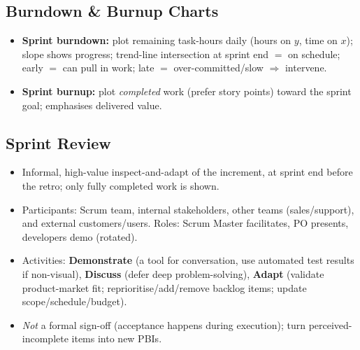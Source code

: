 \documentclass[hidelinks]{article}
\begin{document}
\subsection{Burndown \& Burnup Charts}
\begin{itemize}
  \item \textbf{Sprint burndown:} plot remaining task-hours daily (hours on $y$, time on $x$);
        slope shows progress; trend-line intersection at sprint end $=$ on schedule; early $=$ can
        pull in work; late $=$ over-committed/slow $\Rightarrow$ intervene.
  \item \textbf{Sprint burnup:} plot \emph{completed} work (prefer story points) toward the sprint
        goal; emphasises delivered value.
\end{itemize}

\subsection{Sprint Review}
\begin{itemize}
  \item Informal, high-value inspect-and-adapt of the increment, at sprint end before the retro;
        only fully completed work is shown.
  \item Participants: Scrum team, internal stakeholders, other teams (sales/support), and external
        customers/users. Roles: Scrum Master facilitates, PO presents, developers demo (rotated).
  \item Activities: \textbf{Demonstrate} (a tool for conversation, use automated test results if
        non-visual), \textbf{Discuss} (defer deep problem-solving), \textbf{Adapt} (validate
        product-market fit; reprioritise/add/remove backlog items; update scope/schedule/budget).
  \item \emph{Not} a formal sign-off (acceptance happens during execution); turn perceived-incomplete
        items into new PBIs.
\end{itemize}
\end{document}
